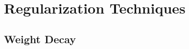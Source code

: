 \chapter{Regularization Techniques} \label{chapter: regularization techniques}

\section{Weight Decay \cite{dnn-1}}\label{regularization techniques: Weight Decay}








































